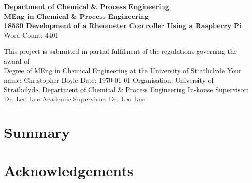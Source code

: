 \documentclass[twoside,a4]{report}
\def\atitle{Development of a Rheometer Controller Using a Raspberry Pi}
\def\thewords{4401}
\def\achapter{preamble}  %
\begin{document}
	\begin{titlepage}
		\centering
		\vskip3cm
		{
			\bfseries\Large
			Department of Chemical \& Process Engineering\\
			\vskip1cm
			MEng in Chemical \& Process Engineering\\
			18530
			\vskip3cm
			\LARGE\atitle
		}
		\vskip3cm
		{\small Word Count: \thewords}
		\vskip1cm
		\begin{flushleft}
			This project is submitted in partial fulfilment of the regulations governing the award of \\
			Degree of MEng in Chemical Engineering at the University of Strathclyde
			\vskip2cm
			Your name: Christopher Boyle \hfill Date: \today
			\vskip1cm
			Organisation: University of Strathclyde, Department of Chemical \& Process Engineering\newline%
			In-house Supervisor: Dr. Leo Lue \newline%
			Academic Supervisor: Dr. Leo Lue
		\end{flushleft}
	\end{titlepage}

	
	\chapter*{Summary}
	\def\achapter{Summary}
	\newpage
	
	\def\achapter{Contents}
	\tableofcontents
	
	\chapter*{Acknowledgements}
	\def\achapter{Acknowledgements}
	
\end{document}
